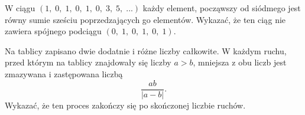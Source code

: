 


\noindent
W ciągu $(1,\; 0,\; 1,\; 0,\; 1,\; 0,\; 3,\; 5,\; ...)$ każdy element, począwszy od siódmego jest równy sumie sześciu poprzedzających go elementów. Wykazać, że ten ciąg nie zawiera spójnego podciągu $(0, \;1, \;0, \;1,\; 0,\;1)$.



\noindent
Na tablicy zapisano dwie dodatnie i różne liczby całkowite. W każdym ruchu, przed którym na tablicy znajdowały się liczby $a > b$, mniejsza z obu liczb jest zmazywana i zastępowana liczbą 
\[	
	\frac{ab}{|a - b|}.
\]
Wykazać, że ten proces zakończy się po skończonej liczbie ruchów.\\



